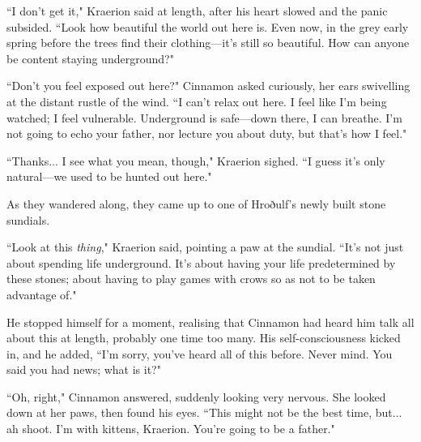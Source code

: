 ``I don't get it," Kraerion said at length, after his heart slowed and the panic subsided.
``Look how beautiful the world out here is.
Even now, in the grey early spring before the trees find their clothing---it's still so beautiful.
How can anyone be content staying underground?"

``Don't you feel exposed out here?" Cinnamon asked curiously, her ears swivelling at the distant rustle of the wind.
``I can't relax out here.
I feel like I'm being watched; I feel vulnerable.
Underground is safe---down there, I can breathe.
I'm not going to echo your father, nor lecture you about duty, but that's how I feel."

``Thanks... I see what you mean, though," Kraerion sighed.
``I guess it's only natural---we used to be hunted out here."

As they wandered along, they came up to one of Hroðulf's newly built stone sundials.

``Look at this \textit{thing}," Kraerion said, pointing a paw at the sundial.
``It's not just about spending life underground.
It's about having your life predetermined by these stones; about having to play games with crows so as not to be taken advantage of."

He stopped himself for a moment, realising that Cinnamon had heard him talk all about this at length, probably one time too many.
His self-consciousness kicked in, and he added, ``I'm sorry, you've heard all of this before.
Never mind.
You said you had news; what is it?"

``Oh, right," Cinnamon answered, suddenly looking very nervous.
She looked down at her paws, then found his eyes.
``This might not be the best time, but... ah shoot.
I'm with kittens, Kraerion.
You're going to be a father."
